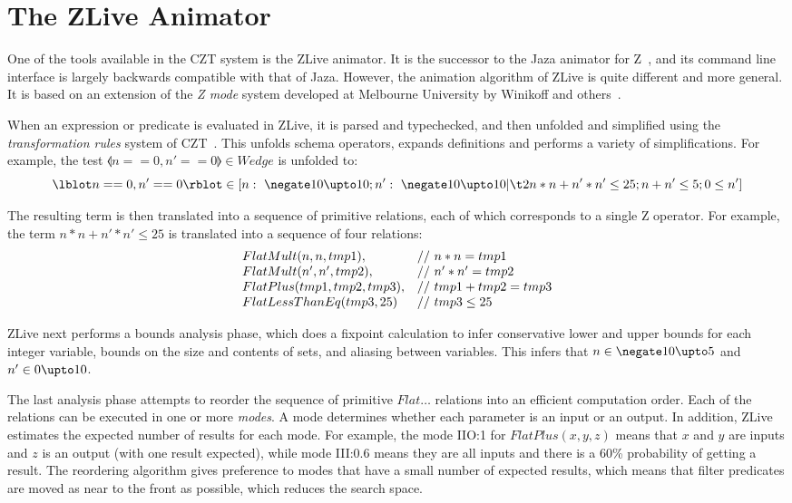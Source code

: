 \documentclass{llncs}
\begin{document}
\section{The ZLive Animator}\label{sect:zlive}

One of the tools available in the CZT system is the ZLive animator.
It is the successor to the Jaza animator for Z~\cite{utting:jaza},
and its command line interface is largely backwards compatible with that of
Jaza.  However, the animation algorithm of ZLive is quite different and
more general.  It is based on an extension of the \emph{Z mode} system
developed at Melbourne University by Winikoff and
others~\cite{kazmierczak:animation98,winikoff:modes-subtypes98}.

When an expression or predicate is evaluated in ZLive, it is
parsed and typechecked, and then unfolded and simplified using
the \emph{transformation rules} system of CZT~\cite{utting:rules07}.
This unfolds schema operators, expands definitions and performs a
variety of simplifications.  For example, the test $\lblot n==0, n'==0
\rblot \in Wedge$ is unfolded to:
\[
  \lblot n == 0 , n' == 0 \rblot \in 
 [ n :~\negate 10 \upto 10; n' :~\negate 10 \upto 10 | \\
   \t2 n * n + n' * n'  \leq 25; n + n' \leq 5; 0 \leq n' ]
\]

The resulting term is then translated into a sequence of primitive
relations, each of which corresponds to a single Z operator.
For example, the term $n * n + n' * n'  \leq 25$ is 
translated into a sequence of four relations:
\[
\begin{array}{l@{\quad}l}
   FlatMult(n, n, tmp1),       & //~ n * n = tmp1 \\
   FlatMult(n', n', tmp2),     & //~ n' * n' = tmp2 \\
   FlatPlus(tmp1, tmp2, tmp3), & //~ tmp1 + tmp2 = tmp3 \\
   FlatLessThanEq(tmp3, 25)    & //~ tmp3 \leq 25
\end{array}
\]

ZLive next performs a bounds analysis phase, which does a fixpoint
calculation to infer conservative lower and upper bounds for each
integer variable, bounds on the size and contents of sets, and
aliasing between variables.  This infers that $n \in \negate 10 \upto
5$ and $n' \in 0 \upto 10$.

The last analysis phase attempts to reorder the sequence of primitive
$Flat\ldots$ relations into an efficient computation order.  Each of
the relations can be executed in one or more \emph{modes}.  A mode
determines whether each parameter is an input or an output.  In
addition, ZLive estimates the expected number of results for each
mode.  For example, the mode IIO:1 for $FlatPlus(x,y,z)$ means that
$x$ and $y$ are inputs and $z$ is an output (with one result
expected), while mode III:0.6 means they are all inputs and there is a
60\% probability of getting a result.  The reordering algorithm gives
preference to modes that have a small number of expected results,
which means that filter predicates are moved as near to the front as
possible, which reduces the search space.
\end{document}
